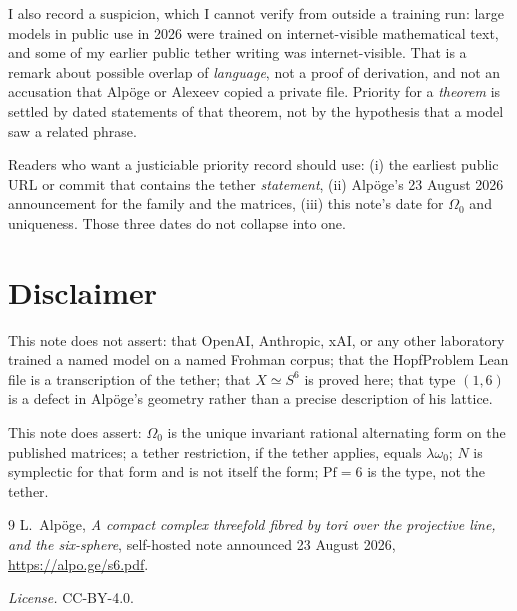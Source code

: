 \documentclass[11pt,a4paper]{article}
\theoremstyle{definition}
\theoremstyle{remark}
\newcommand{\Pf}{\mathrm{Pf}}
\begin{document}
I also record a suspicion, which I cannot verify from outside a training run: large models in public use in 2026 were trained on internet-visible mathematical text, and some of my earlier public tether writing was internet-visible. That is a remark about possible overlap of \emph{language}, not a proof of derivation, and not an accusation that Alp\"oge or Alexeev copied a private file. Priority for a \emph{theorem} is settled by dated statements of that theorem, not by the hypothesis that a model saw a related phrase.

Readers who want a justiciable priority record should use: (i) the earliest public URL or commit that contains the tether \emph{statement}, (ii) Alp\"oge's 23 August 2026 announcement for the family and the matrices, (iii) this note's date for $\Omega_0$ and uniqueness. Those three dates do not collapse into one.

\section*{Disclaimer}

This note does not assert: that OpenAI, Anthropic, xAI, or any other laboratory trained a named model on a named Frohman corpus; that the HopfProblem Lean file is a transcription of the tether; that $X\simeq S^6$ is proved here; that type $(1,6)$ is a defect in Alp\"oge's geometry rather than a precise description of his lattice.

This note does assert: $\Omega_0$ is the unique invariant rational alternating form on the published matrices; a tether restriction, if the tether applies, equals $\lambda\omega_0$; $N$ is symplectic for that form and is not itself the form; $\Pf=6$ is the type, not the tether.

\begin{thebibliography}{9}
L.\ Alp\"oge,
\emph{A compact complex threefold fibred by tori over the projective line, and the six-sphere},
self-hosted note announced 23 August 2026,
\url{https://alpo.ge/s6.pdf}.
\end{thebibliography}

\noindent\textit{License.} CC-BY-4.0.
\end{document}
